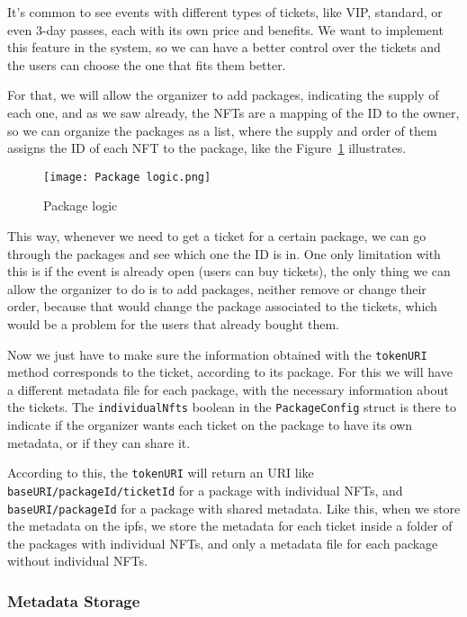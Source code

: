 It's common to see events with different types of tickets, like VIP, standard,
or even 3-day passes, each with its own price and benefits. We want to
implement this feature in the system, so we can have a better control over the
tickets and the users can choose the one that fits them better.

For that, we will allow the organizer to add packages, indicating the supply of
each one, and as we saw already, the NFTs are a mapping of the ID to the owner,
so we can organize the packages as a list, where the supply and order of them
assigns the ID of each NFT to the package, like the
Figure~\ref{fig:package_logic} illustrates.

\begin{figure}[H]
	\texttt{[image: Package logic.png]}
	\centering
	\caption{Package logic}\label{fig:package_logic}
\end{figure}

This way, whenever we need to get a ticket for a certain package, we can go
through the packages and see which one the ID is in. One only limitation with
this is if the event is already open (users can buy tickets), the only thing we
can allow the organizer to do is to add packages, neither remove or change
their order, because that would change the package associated to the tickets,
which would be a problem for the users that already bought them.

Now we just have to make sure the information obtained with the
\texttt{tokenURI} method corresponds to the ticket, according to its package.
For this we will have a different metadata file for each package, with the
necessary information about the tickets. The \texttt{individualNfts} boolean in
the \texttt{PackageConfig} struct is there to indicate if the organizer wants
each ticket on the package to have its own metadata, or if they can share it.

According to this, the \texttt{tokenURI} will return an URI like
\texttt{baseURI/packageId/ticketId} for a package with individual NFTs, and
\texttt{baseURI/packageId} for a package with shared metadata. Like this, when
we store the metadata on the \gls{ipfs}, we store the metadata for each ticket
inside a folder of the packages with individual NFTs, and only a metadata file
for each package without individual NFTs.

\subsubsection{Metadata Storage}\label{subsubsec:metadata_storage}

